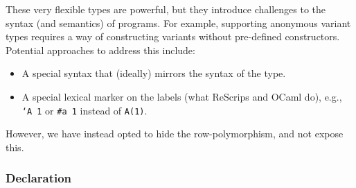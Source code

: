 \documentclass[11pt]{article}
\begin{document}
These very flexible types are powerful, but they introduce challenges to the
syntax (and semantics) of programs. For example, supporting anonymous variant
types requires a way of constructing variants without pre-defined constructors.
Potential approaches to address this include:

\begin{itemize}
\item A special syntax that (ideally) mirrors the syntax of the type.
\item A special lexical marker on the labels (what ReScrips and OCaml do),
e.g., \texttt{`A 1} or \texttt{\#a 1} instead of \texttt{A(1)}.
\end{itemize}

However, we have instead opted to hide the row-polymorphism, and not expose
this.

\subsubsection{Declaration}
\label{sec:org34f61c2}
\end{document}
